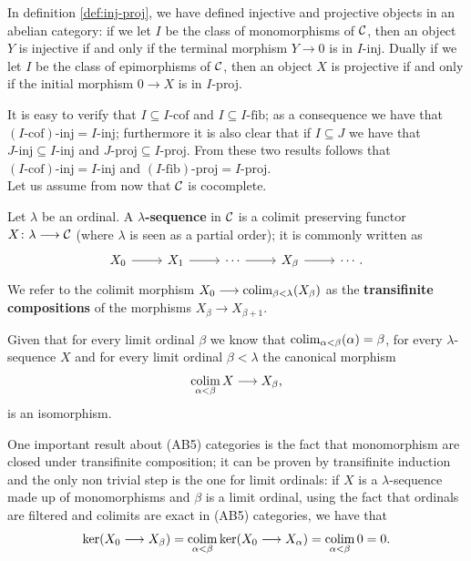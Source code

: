 \begin{remark}
	In definition \ref{def:inj-proj}, we have defined injective and projective objects in an abelian category: if we let $I$ be the class of monomorphisms of $\mathcal{C}$, then an object $Y$ is injective if and only if the terminal morphism $Y \longrightarrow 0$ is in $I$-inj. Dually if we let $I$ be the class of epimorphisms of $\mathcal{C}$, then an object $X$ is projective if and only if the initial morphism $0 \longrightarrow X$ is in $I$-proj.
\end{remark}

It is easy to verify that $I \subseteq I\text{-cof}$ and $I \subseteq I\text{-fib}$; as a consequence we have that $(I\text{-cof})\text{-inj} = I \text{-inj}$; furthermore it is also clear that if $I \subseteq J$ we have that $J \text{-inj} 	\subseteq I \text{-inj}$ and $J \text{-proj} 	\subseteq I \text{-proj}$. From these two results follows that $(I\text{-cof})\text{-inj} = I \text{-inj}$ and $(I\text{-fib})\text{-proj} = I \text{-proj}$.  \\
Let us assume from now that $\mathcal{C}$ is cocomplete.

\begin{definition}
	Let $\lambda$ be an ordinal. A $\lambda$\textbf{-sequence} in $\mathcal{C}$ is a colimit preserving functor $X \colon \lambda \longrightarrow \mathcal{C}$ (where $\lambda$ is seen as a partial order); it is commonly written as
	\[\begin{tikzcd}
		{X_0} & {X_1} & \cdots & {X_\beta} & {\cdots.}
		\arrow[from=1-1, to=1-2]
		\arrow[from=1-2, to=1-3]
		\arrow[from=1-3, to=1-4]
		\arrow[from=1-4, to=1-5]
	\end{tikzcd}\]
	We refer to the colimit morphism $X_0 \longrightarrow \colim_{\beta < \lambda}(X_\beta)$ as the \textbf{transifinite compositions} of the morphisms $X_\beta \longrightarrow X_{\beta +1}$.
\end{definition}
Given that for every limit ordinal $\beta$ we know that $\colim_{\alpha < \beta} (\alpha) = \beta$, for every $\lambda$-sequence $X$ and for every limit ordinal $\beta < \lambda$ the canonical morphism
\[\colim_{\alpha < \beta} X \longrightarrow X_\beta,\]
is an isomorphism.


\begin{remark}
	One important result about (AB5) categories is the fact that monomorphism are closed under transifinite composition; it can be proven by transifinite induction and the only non trivial step is the one for limit ordinals: if $X$ is a $\lambda$-sequence made up of monomorphisms and $\beta$ is a limit ordinal, using the fact that ordinals are filtered and colimits are exact in (AB5) categories, we have that 
	\[\ker(X_0 \longrightarrow X_\beta) = \colim_{\alpha< \beta} \ker(X_0 \longrightarrow X_\alpha) =  \colim_{\alpha< \beta} 0 = 0.\]
\end{remark}


